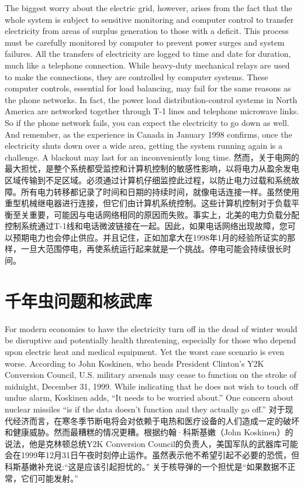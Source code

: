 \begin{Parallel}{97mm}{45mm}
  \ParallelLText
  {The biggest worry about the electric grid, however, arises from the fact that the whole system is subject to sensitive monitoring and computer control to transfer electricity from areas of surplus generation to those with a deficit. This process must be carefully monitored by computer to prevent power surges and system failures. All the transfers of electricity are logged to time and date for duration, much like a telephone connection. While heavy-duty mechanical relays are used to make the connections, they are controlled by computer systems. These computer controls, essential for load balancing, may fail for the same reasons as the phone networks. In fact, the power load distribution-control systems in North America are networked together through T-1 lines and telephone microwave links. So if the phone network fails, you can expect the electricity to go down as well. And remember, as the experience in Canada in January 1998 confirms, once the electricity shuts down over a wide area, getting the system running again is a challenge. A blackout may last for an inconveniently long time.  }  
  \ParallelRText
  {\small 然而，关于电网的最大担忧，是整个系统都受监控和计算机控制的敏感性影响，以将电力从盈余发电区域传输到不足区域。必须通过计算机仔细监控此过程，以防止电力过载和系统故障。所有电力转移都记录了时间和日期的持续时间，就像电话连接一样。虽然使用重型机械继电器进行连接，但它们由计算机系统控制。这些计算机控制对于负载平衡至关重要，可能因与电话网络相同的原因而失败。事实上，北美的电力负载分配控制系统通过T-1线和电话微波链接在一起。因此，如果电话网络出现故障，您可以预期电力也会停止供应。并且记住，正如加拿大在1998年1月的经验所证实的那样，一旦大范围停电，再使系统运行起来就是一个挑战。停电可能会持续很长时间。}
  \ParallelPar


\section{千年虫问题和核武库}

  \ParallelLText
  {For modern economies to have the electricity turn off in the dead of winter would be disruptive and potentially health threatening, especially for those who depend upon electric heat and medical equipment. Yet the worst case scenario is even worse. According to John Koskinen, who heads President Clinton's Y2K Conversion Council, U.S. military arsenals may cease to function on the stroke of midnight, December 31, 1999. While indicating that he does not wish to touch off undue alarm, Koskinen adds, “It needs to be worried about.” One concern about nuclear missiles “is if the data doesn't function and they actually go off.”}  
  \ParallelRText
  {\small 对于现代经济而言，在寒冬季节断电将会对依赖于电热和医疗设备的人们造成一定的破坏和健康威胁。然而最糟糕的情况更糟。根据约翰·科斯基嫩（John Koskinen）的说法，他是克林顿总统Y2K Conversion Council的负责人，美国军队的武器库可能会在1999年12月31日午夜时刻停止运作。虽然表示他不希望引起不必要的恐慌，但科斯基嫩补充说:“这是应该引起担忧的。” 关于核导弹的一个担忧是“如果数据不正常，它们可能发射。”}
  \ParallelPar



\end{Parallel}
